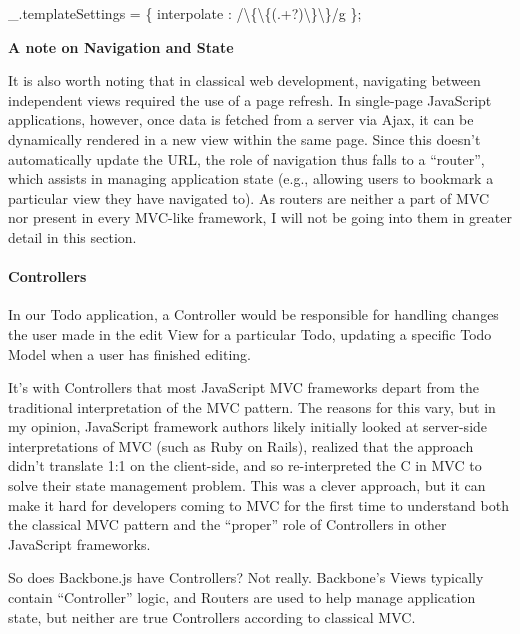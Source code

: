 \documentclass[9pt]{book}
\newenvironment{Shaded}{}{}
\newcommand{\DataTypeTok}[1]{\textcolor[rgb]{0.56,0.13,0.00}{{#1}}}
\newcommand{\FloatTok}[1]{\textcolor[rgb]{0.25,0.63,0.44}{{#1}}}
\newcommand{\OtherTok}[1]{\textcolor[rgb]{0.00,0.44,0.13}{{#1}}}
\newcommand{\FunctionTok}[1]{\textcolor[rgb]{0.02,0.16,0.49}{{#1}}}
\newcommand{\NormalTok}[1]{{#1}}
\begin{document}
\begin{Shaded}
\begin{Highlighting}[]
\OtherTok{_}\NormalTok{.}\FunctionTok{templateSettings} \NormalTok{= \{ }\DataTypeTok{interpolate }\NormalTok{: }\OtherTok{/}\FloatTok{\textbackslash{}\{\textbackslash{}\{(}\OtherTok{.}\FloatTok{+?)\textbackslash{}\}\textbackslash{}\}}\OtherTok{/g} \NormalTok{\};}
\end{Highlighting}
\end{Shaded}

\textbf{A note on Navigation and State}

It is also worth noting that in classical web development, navigating
between independent views required the use of a page refresh. In
single-page JavaScript applications, however, once data is fetched from
a server via Ajax, it can be dynamically rendered in a new view within
the same page. Since this doesn't automatically update the URL, the role
of navigation thus falls to a ``router'', which assists in managing
application state (e.g., allowing users to bookmark a particular view
they have navigated to). As routers are neither a part of MVC nor
present in every MVC-like framework, I will not be going into them in
greater detail in this section.

\paragraph{Controllers}\label{controllers}

In our Todo application, a Controller would be responsible for handling
changes the user made in the edit View for a particular Todo, updating a
specific Todo Model when a user has finished editing.

It's with Controllers that most JavaScript MVC frameworks depart from
the traditional interpretation of the MVC pattern. The reasons for this
vary, but in my opinion, JavaScript framework authors likely initially
looked at server-side interpretations of MVC (such as Ruby on Rails),
realized that the approach didn't translate 1:1 on the client-side, and
so re-interpreted the C in MVC to solve their state management problem.
This was a clever approach, but it can make it hard for developers
coming to MVC for the first time to understand both the classical MVC
pattern and the ``proper'' role of Controllers in other JavaScript
frameworks.

So does Backbone.js have Controllers? Not really. Backbone's Views
typically contain ``Controller'' logic, and Routers are used to help
manage application state, but neither are true Controllers according to
classical MVC.
\end{document}
